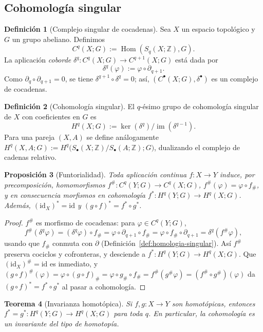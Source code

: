 \documentclass[11pt,a4paper]{article}
\theoremstyle{plain}
\newtheorem{theorem}{Teorema}[section]
\newtheorem{proposition}[theorem]{Proposición}
\theoremstyle{definition}
\newtheorem{definition}[theorem]{Definición}
\theoremstyle{remark}
\newcommand{\ZZ}{\mathbb Z}
\DeclareMathOperator{\im}{im}
\DeclareMathOperator{\Hom}{Hom}
\begin{document}
\subsection{Cohomología singular}

\begin{definition}[Complejo singular de cocadenas]
\label{def:cocadenas-singulares}
Sea $X$ un espacio topológico y $G$ un grupo abeliano. Definimos
\[
C^q(X;G):=\Hom(S_q(X;\ZZ),G).
\]
La aplicación \emph{coborde} $\delta^q:C^q(X;G)\to C^{q+1}(X;G)$ está dada
por
\[
\delta^q(\varphi):=\varphi\circ\partial_{q+1}.
\]
Como $\partial_q\circ\partial_{q+1}=0$, se tiene $\delta^{q+1}\circ\delta^q=0$;
así, $(C^\bullet(X;G),\delta^\bullet)$ es un complejo de cocadenas.
\end{definition}

\begin{definition}[Cohomología singular]
\label{def:cohomologia-singular}
El $q$-ésimo grupo de cohomología singular de $X$ con coeficientes en $G$
es
\[
H^q(X;G):=\ker(\delta^q)/\im(\delta^{q-1}).
\]
Para una pareja $(X,A)$ se define análogamente
$H^q(X,A;G):=H^q\big(S_\bullet(X;\ZZ)/S_\bullet(A;\ZZ);G\big)$, dualizando
el complejo de cadenas relativo.
\end{definition}

\begin{proposition}[Funtorialidad]
\label{prop:funtorialidad-cohomologia}
Toda aplicación continua $f:X\to Y$ induce, por precomposición,
homomorfismos $f^\#:C^q(Y;G)\to C^q(X;G)$, $f^\#(\varphi)=\varphi\circ f_\#$,
y en consecuencia morfismos en cohomología $f^*:H^q(Y;G)\to H^q(X;G)$.
Además, $(\mathrm{id}_X)^*=\mathrm{id}$ y $(g\circ f)^*=f^*\circ g^*$.
\end{proposition}

\begin{proof}
$f^\#$ es morfismo de cocadenas: para $\varphi\in C^q(Y;G)$,
\[
f^\#(\delta^q\varphi)=(\delta^q\varphi)\circ f_\#=\varphi\circ\partial_{q+1}\circ f_\#=\varphi\circ f_\#\circ\partial_{q+1}=\delta^q(f^\#\varphi),
\]
usando que $f_\#$ conmuta con $\partial$ (Definición~\ref{def:homologia-singular}).
Así $f^\#$ preserva cociclos y cofronteras, y desciende a
$f^*:H^q(Y;G)\to H^q(X;G)$. Que $(\mathrm{id}_X)^\#=\mathrm{id}$ es
inmediato, y $(g\circ f)^\#(\varphi)=\varphi\circ(g\circ f)_\#=\varphi\circ g_\#\circ f_\#=f^\#(g^\#\varphi)=(f^\#\circ g^\#)(\varphi)$
da $(g\circ f)^*=f^*\circ g^*$ al pasar a cohomología.
\end{proof}

\begin{theorem}[Invarianza homotópica]
\label{thm:invarianza-homotopica-cohomologia}
Si $f,g:X\to Y$ son homotópicas, entonces $f^*=g^*:H^q(Y;G)\to H^q(X;G)$
para toda $q$. En particular, la cohomología es un invariante del tipo de
homotopía.
\end{theorem}
\end{document}
